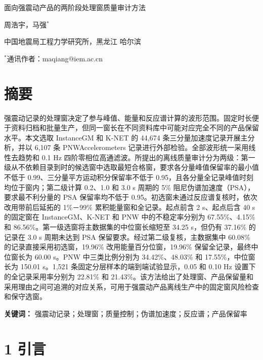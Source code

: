 \documentclass[UTF8,a4paper,zihao=5]{ctexart}
\begin{document}
\begin{center}
{\heiti 面向强震动产品的两阶段处理窗质量审计方法\par}
\vspace{0.8em}
{ 周浩宇，马强$^{*}$\par}
\vspace{0.4em}
{ 中国地震局工程力学研究所，黑龙江 哈尔滨\par}
\vspace{0.4em}
{ $^{*}$通讯作者：maqiang@iem.ac.cn\par}
\end{center}

\section*{摘要}\label{ux6458ux8981}

强震动记录的处理窗决定了参与峰值、能量和反应谱计算的波形范围。固定时长便于资料归档和批量生产，但同一窗长在不同资料库中可能对应完全不同的产品保留水平。本文选取 InstanceGM 和 K-NET 的 44,674 条三分量加速度记录开展主分析，并以 6,107 条 PNWAccelerometers 记录进行外部检验。全部波形统一采用线性去趋势和 0.1 Hz 四阶零相位高通滤波。所提出的离线质量审计分为两级：第一级从不依赖目录到时的候选窗中选取最短合格窗，要求各分量峰值保留率的最小值不低于 0.99、三分量平方运动积分保留率不低于 0.95，且各分量全记录峰值时刻均位于窗内；第二级计算 0.2、1.0 和 3.0 s 周期的 5\% 阻尼伪谱加速度（PSA），要求最不利分量的 PSA 保留率均不低于 0.95。初选窗未通过反应谱复核时，依次改用带前后延拓的 1\%－99\% 累积能量窗和全记录。起点前含 2 s、起点后含 40 s 的固定窗在 InstanceGM、K-NET 和 PNW 中的不稳定率分别为 67.55\%、4.15\% 和 86.56\%。第一级选窗将主数据集的中位窗长缩短至 34.25 s，但仍有 37.16\% 的记录在 3.0 s 周期未达到 PSA 保留要求。经过第二级复核，主数据集中 60.08\% 的记录直接采用初选窗，19.96\% 改用能量百分位窗，19.96\% 保留全记录，最终中位窗长为 60.00 s。PNW 中三类比例分别为 34.42\%、48.03\% 和 17.55\%，中位窗长为 150.01 s。1,521 条固定分层样本的端到端试验显示，0.05 和 0.10 Hz 设置下的全记录采用率分别为 22.81\% 和 21.43\%。该方法给出了处理窗、产品保留量和采用理由之间可追溯的对应关系，可用于强震动产品离线生产中的固定窗风险检查和保守选窗。

\textbf{关键词：} 强震动记录；处理窗；质量控制；伪谱加速度；反应谱；产品保留率

\section*{1 引言}\label{ux5f15ux8a00}
\end{document}
